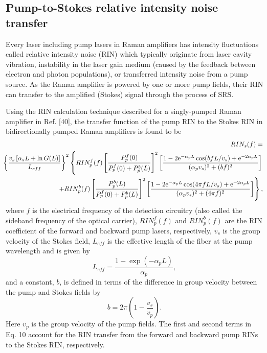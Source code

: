 \subsection{Pump-to-Stokes relative intensity noise transfer}

Every laser including pump lasers in Raman amplifiers has intensity fluctuations called relative intensity noise (RIN) which typically originate from laser cavity vibration, instability in the laser gain medium (caused by the feedback between electron and photon populations), or transferred intensity noise from a pump source. As the Raman amplifier is powered by one or more pump fields, their RIN can transfer to the amplified (Stokes) signal through the process of SRS.

Using the RIN calculation technique described for a singly-pumped Raman amplifier in Ref. [40], the transfer function of the pump RIN to the Stokes RIN in bidirectionally pumped Raman amplifiers is found to be
\begin{eqnarray}
&&\hspace{-0.7cm}RIN_s(f) = \nonumber\\
&&\hspace{-0.5cm}\left\{\frac{v_s\left[\alpha_s L + \ln G(L)\right]}{L_{eff}}\right\}^2  
 \left\{RIN_p^f(f) \left[\frac{P_p^f(0)}{P_p^f(0)+P_p^b(L)}\right]^2 \left[\frac{1-2\mathrm{e}^{-\alpha_p L}\cos(bfL/v_s)+\mathrm{e}^{-2 \alpha_p L}}{(\alpha_p v_s)^2+(b f)^2}\right] \right.\nonumber\\
&&\hspace{-0.5cm} \left.+RIN_p^b(f) \left[\frac{P_p^b(L)}{P_p^f(0)+P_p^b(L)}\right]^2 \left[\frac{1-2\mathrm{e}^{-\alpha_p L}\cos(4 \pi f L/v_s)+\mathrm{e}^{-2 \alpha_p L}}{(\alpha_p v_s)^2+(4 \pi f)^2}\right]\right\}, 
\end{eqnarray}
where $f$ is the electrical frequency of the detection circuitry (also called the sideband frequency of the optical carrier), $RIN_p^f(f)$ and $RIN_p^b(f)$ are the RIN coefficient of the forward and backward pump lasers, respectively, $v_s$ is the group velocity of the Stokes field, $L_{eff}$ is the effective length of the fiber at the pump wavelength and is given by
\begin{equation}
L_{eff}=\frac{1-\exp(-\alpha_p L)}{\alpha_p},
\end{equation}
and a constant, $b$, is defined in terms of the difference in group velocity between the pump and Stokes fields by
\begin{equation}
b = 2\pi\left(1-\frac{v_s}{v_p}\right).
\end{equation}
Here $v_p$ is the group velocity of the pump fields. The first and second terms in Eq. 10 account for the RIN transfer from the forward and backward pump RINs to the Stokes RIN, respectively.

